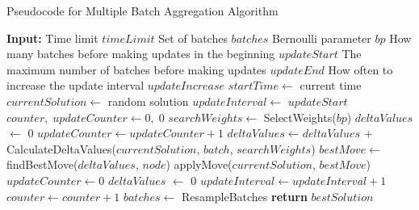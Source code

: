 \begin{algorithm}[H]
    \fontsize{12pt}{12pt}\selectfont
    \caption{Pseudocode for Multiple Batch Aggregation Algorithm} \label{multiple_batches_v2}
    \begin{algorithmic}[1]
        \State \textbf{Input:}
        \State \hspace{\algorithmicindent} Time limit $timeLimit$
        \State \hspace{\algorithmicindent} Set of batches $batches$
        \State \hspace{\algorithmicindent} Bernoulli parameter $bp$ 
        \State \hspace{\algorithmicindent} How many batches before making updates in the beginning $updateStart$
        \State \hspace{\algorithmicindent} The maximum number of batches before making updates $updateEnd$
        \State \hspace{\algorithmicindent} How often to increase the update interval $updateIncrease$
        \State $startTime \gets$ current time 
        \State $currentSolution \gets$ random solution
        \State $updateInterval \gets$ $updateStart$
        \State $counter, \; updateCounter \gets 0, \; 0$    
        \State $searchWeights \gets$ SelectWeights($bp$)
        \State $deltaValues$ $\gets$ $0$
                \State $updateCounter \gets updateCounter + 1 $
                \State $deltaValues \gets deltaValues$ + 
                \Statex \hspace{\algorithmicindent} \hspace{\algorithmicindent} CalculateDeltaValues($currentSolution$, $batch$, $searchWeights$)
                        \State $bestMove \gets$ findBestMove($deltaValues$, $node$)
                            \State applyMove($currentSolution$, $bestMove$)
                        \EndIf
                    \EndFor
                    \State $updateCounter \gets 0$ 
                    \State $deltaValues$ $\gets$ $0$
                        \State $updateInterval \gets updateInterval + 1$ 
                    \EndIf
                \EndIf
                \State $counter \gets counter + 1$
            \EndFor
            \State $batches \gets$ ResampleBatches 
        \EndWhile 
        \State \textbf{return} $bestSolution$
    \end{algorithmic}
\end{algorithm}


